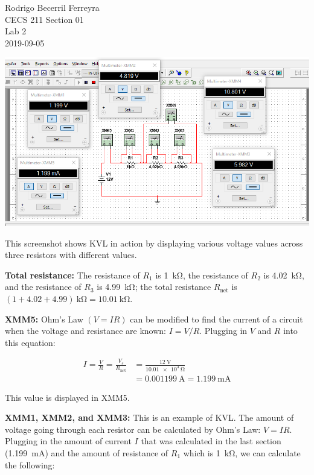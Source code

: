 \documentclass{article}
\begin{document}
\begin{flushright}
    \noindent
    Rodrigo Becerril Ferreyra\\
    CECS 211 Section 01\\
    Lab 2\\
    2019-09-05
\end{flushright}

\includegraphics[width=\textwidth]{Lab2.png}

This screenshot shows KVL in action by displaying various
voltage values across three resistors with different values.

\textbf{Total resistance:}
The resistance of $R_1$ is \SI{1}{\kilo\ohm}, the resistance of
$R_2$ is \SI{4.02}{\kilo\ohm}, and the resistance of $R_3$ is
\SI{4.99}{\kilo\ohm}; the total resistance $R_\text{net}$ is
$(1 + 4.02 + 4.99)\ \si{\kilo\ohm} = \SI{10.01}{\kilo\ohm}$.

\textbf{XMM5:}
Ohm's Law $(V=IR)$ can be modified to find the current of
a circuit when the voltage and resistance are known:
$I = V/R$. Plugging in $V$ and $R$ into this equation:

\begin{align*}
    I = \frac{V}{R} = \frac{V_s}{R_\text{net}} &= \frac{\SI{12}{\volt}}{\SI{10.01e3}{\ohm}}\\
    &= \SI{0.001199}{\ampere} = \SI{1.199}{\milli\ampere}
\end{align*}

This value is displayed in XMM5.

\textbf{XMM1, XMM2, and XMM3:}
This is an example of KVL. The amount of
voltage going through each resistor can be calculated by Ohm's
Law: $V=IR$. Plugging in the amount of current $I$
that was calculated in the last
section (\SI{1.199}{\milli\ampere}) and the amount of
resistance of $R_1$ which is \SI{1}{\kilo\ohm}, we can calculate
the following:
\end{document}
